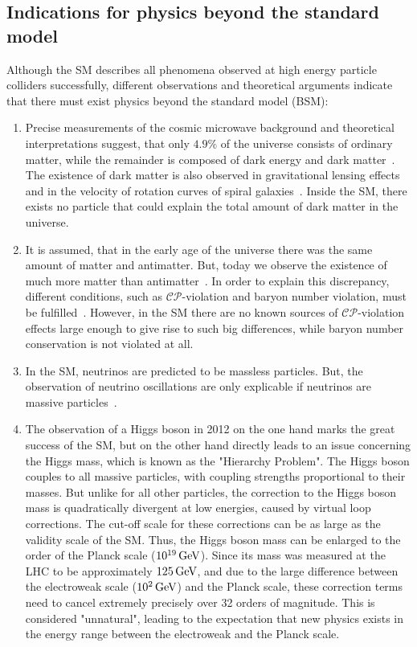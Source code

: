 \subsection*{Indications for physics beyond the standard model}\label{sec:SM_bsm}
Although the SM describes all phenomena observed at high energy particle colliders successfully, different observations and theoretical arguments indicate that there must exist physics beyond the standard model (BSM):
\begin{enumerate}
 \item Precise measurements of the cosmic microwave background and theoretical interpretations suggest, that only $4.9\%$ of the universe consists of ordinary matter, while the remainder is composed of dark energy and dark matter~\cite{DarkMatterPlanck}. The existence of dark matter is also observed in gravitational lensing effects~\cite{DarkMatterLensing} and in the velocity of rotation curves of spiral galaxies~\cite{DarkMatterRotation}. Inside the SM, there exists no particle that could explain the total amount of dark matter in the universe.
 \item It is assumed, that in the early age of the universe there was the same amount of matter and antimatter. But, today we observe the existence of much more matter than antimatter~\cite{Antimatter,AsymSM}. In order to explain this discrepancy, different conditions, such as $\mathcal{CP}$-violation and baryon number violation, must be fulfilled~\cite{Sakharov}. However, in the SM there are no known sources of $\mathcal{CP}$-violation effects large enough to give rise to such big differences, while baryon number conservation is not violated at all.
 \item In the SM, neutrinos are predicted to be massless particles. But, the observation of neutrino oscillations are only explicable if neutrinos are massive particles~\cite{NeutrinoMass,PDG}.
 \item The observation of a Higgs boson in 2012 on the one hand marks the great success of the SM, but on the other hand directly leads to an issue concerning the Higgs mass, which is known as the "Hierarchy Problem". The Higgs boson couples to all massive particles, with coupling strengths proportional to their masses. But unlike for all other particles, the correction to the Higgs boson mass is quadratically divergent at low energies, caused by virtual loop corrections. The cut-off scale for these corrections can be as large as the validity scale of the SM. Thus, the Higgs boson mass can be enlarged to the order of the Planck scale ($10^{19}\,\text{Ge\hspace{-.08em}V}$). Since its mass was measured at the LHC to be approximately $125\,\text{Ge\hspace{-.08em}V}$, and due to the large difference between the electroweak scale ($10^2\,\text{Ge\hspace{-.08em}V}$) and the Planck scale, these correction terms need to cancel extremely precisely over 32 orders of magnitude. This is considered "unnatural", leading to the expectation that new physics exists in the energy range between the electroweak and the Planck scale.

\end{enumerate}
